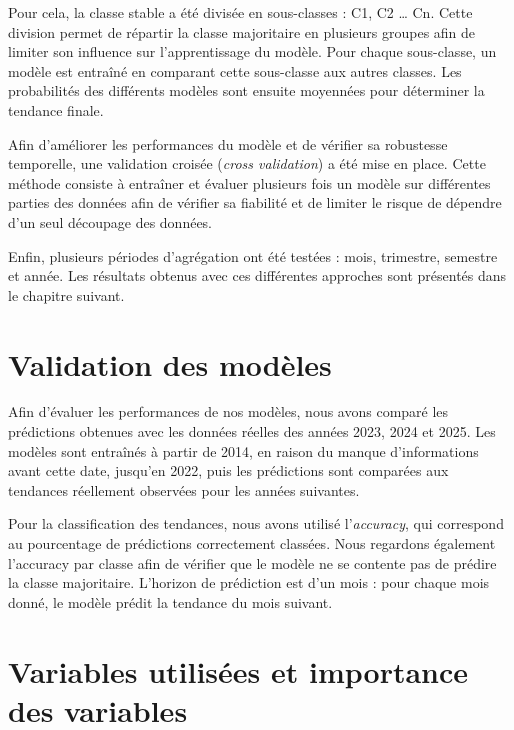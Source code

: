 \documentclass[12pt, a4paper]{report}
\begin{document}
Pour cela, la classe \og stable \fg{} a été divisée en sous-classes : C1, C2 \ldots{} Cn. Cette division permet de répartir la classe majoritaire en plusieurs groupes afin de limiter son influence sur l'apprentissage du modèle. Pour chaque sous-classe, un modèle est entraîné en comparant cette sous-classe aux autres classes. Les probabilités des différents modèles sont ensuite moyennées pour déterminer la tendance finale.

Afin d'améliorer les performances du modèle et de vérifier sa robustesse temporelle, une validation croisée (\textit{cross validation}) a été mise en place. Cette méthode consiste à entraîner et évaluer plusieurs fois un modèle sur différentes parties des données afin de vérifier sa fiabilité et de limiter le risque de dépendre d'un seul découpage des données.

Enfin, plusieurs périodes d'agrégation ont été testées : mois, trimestre, semestre et année. Les résultats obtenus avec ces différentes approches sont présentés dans le chapitre suivant.

\section{Validation des modèles}

Afin d'évaluer les performances de nos modèles, nous avons comparé les prédictions obtenues avec les données réelles des années 2023, 2024 et 2025. Les modèles sont entraînés à partir de 2014, en raison du manque d'informations avant cette date, jusqu'en 2022, puis les prédictions sont comparées aux tendances réellement observées pour les années suivantes.

Pour la classification des tendances, nous avons utilisé l'\textit{accuracy}, qui correspond au pourcentage de prédictions correctement classées. Nous regardons également l'accuracy par classe afin de vérifier que le modèle ne se contente pas de prédire la classe majoritaire. L'horizon de prédiction est d'un mois : pour chaque mois donné, le modèle prédit la tendance du mois suivant.

\section{Variables utilisées et importance des variables}
\end{document}
